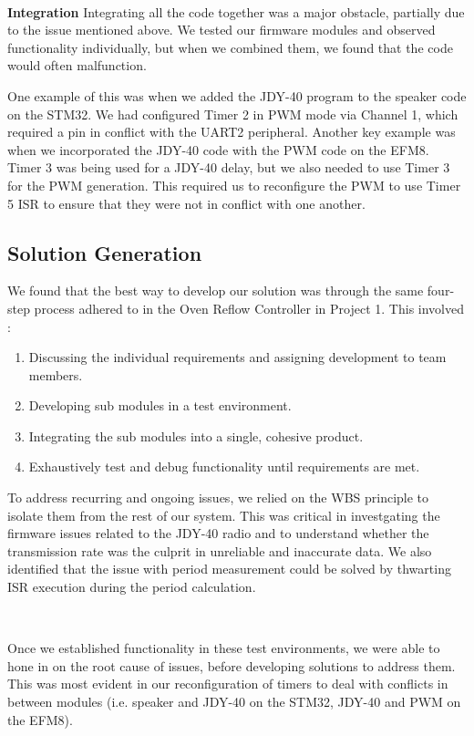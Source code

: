 \documentclass{article}
\begin{document}
\

\textbf{Integration}
Integrating all the code together was a major obstacle, partially due to the issue mentioned above. We tested our firmware modules and observed functionality
individually, but when we combined them, we found that the code would often malfunction.

One example of this was when we added the JDY-40 program to the speaker code on the STM32. We had configured Timer 2 in PWM mode via Channel 1, which
required a pin in conflict with the UART2 peripheral. Another key example was when we incorporated the JDY-40 code with the PWM code
on the EFM8. Timer 3 was being used for a JDY-40 delay, but we also needed to use Timer 3 for the PWM generation. This required us to
reconfigure the PWM to use Timer 5 ISR to ensure that they were not in conflict with one another.

\subsection{Solution Generation}

We found that the best way to develop our solution was through the same four-step process adhered to in the Oven Reflow Controller in Project 1.
This involved :

\begin{enumerate}
  \item Discussing the individual requirements and assigning development to team members.
  \item Developing sub modules in a test environment.
  \item Integrating the sub modules into a single, cohesive product.
  \item Exhaustively test and debug functionality until requirements are met.
\end{enumerate}

To address recurring and ongoing issues, we relied on the WBS principle to isolate them from the rest of our system.
This was critical in investgating the firmware issues related to the JDY-40 radio and to understand whether the transmission rate was the culprit
in unreliable and inaccurate data. We also identified that the issue with period measurement could be solved by thwarting ISR execution during the period calculation.

\

Once we established functionality in these test environments, we were able to hone in on the root cause of issues, before developing solutions to address them. This was most evident
in our reconfiguration of timers to deal with conflicts in between modules (i.e. speaker and JDY-40 on the STM32, JDY-40 and PWM on the EFM8).
\end{document}
